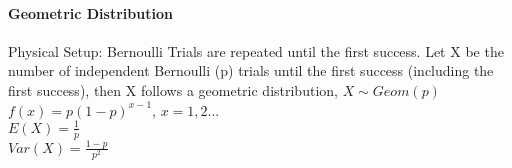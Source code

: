       \paragraph{Geometric Distribution}
        Physical Setup: Bernoulli Trials are repeated until the first success.
        Let X be the number of independent Bernoulli (p) trials until the first
        success (including the first success), then X follows a geometric
        distribution, $X \sim Geom(p)$\\
        $f(x) = p(1-p)^{x-1}$, $x = 1, 2 ...$\\
        $E(X) = \frac{1}{p}$\\
        $Var(X) = \frac{1-p}{p^2}$


